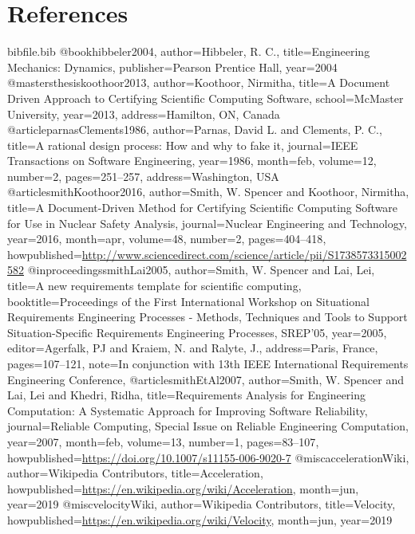 \documentclass[12pt]{article}
\begin{document}
\section{References}
\label{Sec:References}
\begin{filecontents*}{bibfile.bib}
@book{hibbeler2004,
author={Hibbeler, R. C.},
title={Engineering Mechanics: Dynamics},
publisher={Pearson Prentice Hall},
year={2004}}
@mastersthesis{koothoor2013,
author={Koothoor, Nirmitha},
title={A Document Driven Approach to Certifying Scientific Computing Software},
school={McMaster University},
year={2013},
address={Hamilton, ON, Canada}}
@article{parnasClements1986,
author={Parnas, David L. and Clements, P. C.},
title={A rational design process: How and why to fake it},
journal={IEEE Transactions on Software Engineering},
year={1986},
month=feb,
volume={12},
number={2},
pages={251--257},
address={Washington, USA}}
@article{smithKoothoor2016,
author={Smith, W. Spencer and Koothoor, Nirmitha},
title={A Document-Driven Method for Certifying Scientific Computing Software for Use in Nuclear Safety Analysis},
journal={Nuclear Engineering and Technology},
year={2016},
month=apr,
volume={48},
number={2},
pages={404--418},
howpublished={\url{http://www.sciencedirect.com/science/article/pii/S1738573315002582}}}
@inproceedings{smithLai2005,
author={Smith, W. Spencer and Lai, Lei},
title={A new requirements template for scientific computing},
booktitle={Proceedings of the First International Workshop on Situational Requirements Engineering Processes - Methods, Techniques and Tools to Support Situation-Specific Requirements Engineering Processes, SREP'05},
year={2005},
editor={Agerfalk, PJ and Kraiem, N. and Ralyte, J.},
address={Paris, France},
pages={107--121},
note={In conjunction with 13th IEEE International Requirements Engineering Conference,}}
@article{smithEtAl2007,
author={Smith, W. Spencer and Lai, Lei and Khedri, Ridha},
title={Requirements Analysis for Engineering Computation: A Systematic Approach for Improving Software Reliability},
journal={Reliable Computing, Special Issue on Reliable Engineering Computation},
year={2007},
month=feb,
volume={13},
number={1},
pages={83--107},
howpublished={\url{https://doi.org/10.1007/s11155-006-9020-7}}}
@misc{accelerationWiki,
author={Wikipedia Contributors},
title={Acceleration},
howpublished={\url{https://en.wikipedia.org/wiki/Acceleration}},
month=jun,
year={2019}}
@misc{velocityWiki,
author={Wikipedia Contributors},
title={Velocity},
howpublished={\url{https://en.wikipedia.org/wiki/Velocity}},
month=jun,
year={2019}}
\end{filecontents*}
\nocite{*}
\printbibliography[heading=none]
\end{document}
